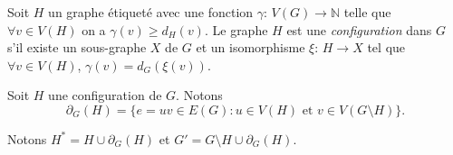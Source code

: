 \documentclass{beamer}
\begin{document}
\begin{frame}
Soit $H$ un graphe étiqueté avec une fonction $\gamma$: $V(G) \to \mathbb{N}$ telle que $\forall v \in V(H)$ on a $\gamma(v) \geq d_H(v)$. Le graphe $H$ est une \emph{configuration} dans $G$ s'il existe un sous-graphe $X$ de $G$ et un isomorphisme $\xi$: $H \to X$ tel que $\forall v \in V(H)$, $\gamma(v) = d_G(\xi(v))$. 
%
%
%

\pause

Soit $H$ une configuration de $G$. Notons
$$
\partial_G(H) = \{e =uv \in E(G) : u \in V(H)\textrm{ et }v \in V(G \setminus H)\}.
$$ 



Notons $H^* = H \cup \partial_G(H)$ et $G'=G\setminus H \cup \partial_G(H)$.
\end{frame}

\end{document}
